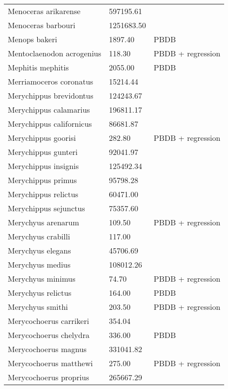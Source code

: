 \documentclass{article}
\begin{document}
\begin{center}
\begin{longtable}{p{} p{} p{}}
    Menoceras arikarense & 597195.61 & \cite{Tomiya2013} \\ 
    Menoceras barbouri & 1251683.50 & \cite{Tomiya2013} \\ 
    Menops bakeri & 1897.40 & PBDB \\ 
    Mentoclaenodon acrogenius & 118.30 & PBDB + regression \\ 
    Mephitis mephitis & 2055.00 & PBDB \\ 
    Merriamoceros coronatus & 15214.44 & \cite{Tomiya2013} \\ 
    Merychippus brevidontus & 124243.67 & \cite{Tomiya2013} \\ 
    Merychippus calamarius & 196811.17 & \cite{Tomiya2013} \\ 
    Merychippus californicus & 86681.87 & \cite{Tomiya2013} \\ 
    Merychippus goorisi & 282.80 & PBDB + regression \\ 
    Merychippus gunteri & 92041.97 & \cite{Tomiya2013} \\ 
    Merychippus insignis & 125492.34 & \cite{Tomiya2013} \\ 
    Merychippus primus & 95798.28 & \cite{Tomiya2013} \\ 
    Merychippus relictus & 60471.00 & \cite{McKenna2011} \\ 
    Merychippus sejunctus & 75357.60 & \cite{Tomiya2013} \\ 
    Merychyus arenarum & 109.50 & PBDB + regression \\ 
    Merychyus crabilli & 117.00 & \cite{Johanson1996} \\ 
    Merychyus elegans & 45706.69 & \cite{Tomiya2013} \\ 
    Merychyus medius & 108012.26 & \cite{Tomiya2013} \\ 
    Merychyus minimus & 74.70 & PBDB + regression \\ 
    Merychyus relictus & 164.00 & PBDB \\ 
    Merychyus smithi & 203.50 & PBDB + regression \\ 
    Merycochoerus carrikeri & 354.04 & \cite{Rose2011a} \\ 
    Merycochoerus chelydra & 336.00 & PBDB \\ 
    Merycochoerus magnus & 331041.82 & \cite{Tomiya2013} \\ 
    Merycochoerus matthewi & 275.00 & PBDB + regression \\ 
    Merycochoerus proprius & 265667.29 & \cite{Tomiya2013} \\ 

\end{longtable}
\end{center}
\end{document}
